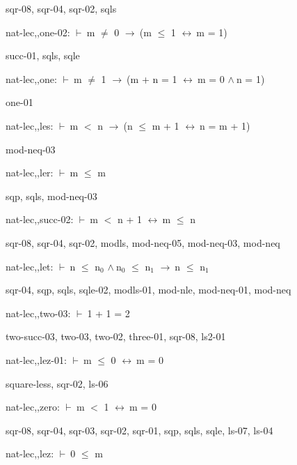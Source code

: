 \documentclass[a4paper]{article}
\newcommand{\Fol}{\mbox{$\vdash\ $}}
\newcommand{\And}{\mbox{$\wedge\ $}}
\newcommand{\Imp}{\mbox{$\rightarrow\ $}}
\newcommand{\Equiv}{\mbox{$\leftrightarrow\ $}}
\begin{document}
sqr-08, sqr-04, sqr-02, sqls

\bigskip

nat-lec,,one-02: 
 \Fol m $\neq$ 0 \Imp (m $\le$ 1 \Equiv m = 1)



succ-01, sqls, sqle

\bigskip

nat-lec,,one: 
 \Fol m $\neq$ 1 \Imp (m + n = 1 \Equiv m = 0 \And n = 1)



one-01

\bigskip

nat-lec,,les: 
 \Fol m $<$ n \Imp (n $\le$ m + 1 \Equiv n = m + 1)



mod-neq-03

\bigskip

nat-lec,,ler: 
 \Fol m $\le$ m



sqp, sqls, mod-neq-03

\bigskip

nat-lec,,succ-02: 
 \Fol m $<$ n + 1 \Equiv m $\le$ n



sqr-08, sqr-04, sqr-02, modls, mod-neq-05, mod-neq-03, mod-neq

\bigskip

nat-lec,,let: 
 \Fol n $\le$ $\mbox{n}_{0}$ \And $\mbox{n}_{0}$ $\le$ $\mbox{n}_{1}$ \Imp n $\le$ $\mbox{n}_{1}$



sqr-04, sqp, sqls, sqle-02, modls-01, mod-nle, mod-neq-01, mod-neq

\bigskip

nat-lec,,two-03: 
 \Fol 1 + 1 = 2



two-succ-03, two-03, two-02, three-01, sqr-08, ls2-01

\bigskip

nat-lec,,lez-01: 
 \Fol m $\le$ 0 \Equiv m = 0



square-less, sqr-02, ls-06

\bigskip

nat-lec,,zero: 
 \Fol m $<$ 1 \Equiv m = 0



sqr-08, sqr-04, sqr-03, sqr-02, sqr-01, sqp, sqls, sqle, ls-07, ls-04

\bigskip

nat-lec,,lez: 
 \Fol 0 $\le$ m
\end{document}
